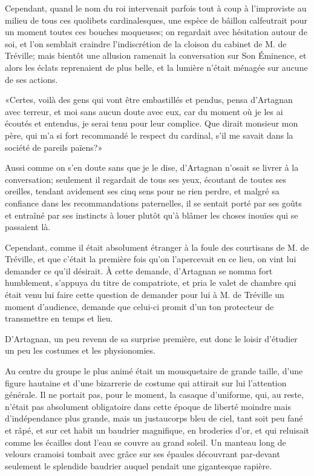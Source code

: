 Cependant, quand le nom du roi intervenait parfois tout à coup à l'improviste au milieu de tous ces quolibets cardinalesques, une espèce de bâillon calfeutrait pour un moment toutes ces bouches moqueuses; on regardait avec hésitation autour de soi, et l'on semblait craindre l'indiscrétion de la cloison du cabinet de M. de Tréville; mais bientôt une allusion ramenait la conversation sur Son Éminence, et alors les éclats reprenaient de plus belle, et la lumière n'était ménagée sur aucune de ses actions. 

«Certes, voilà des gens qui vont être embastillés et pendus, pensa d'Artagnan avec terreur, et moi sans aucun doute avec eux, car du moment où je les ai écoutés et entendus, je serai tenu pour leur complice. Que dirait monsieur mon père, qui m'a si fort recommandé le respect du cardinal, s'il me savait dans la société de pareils païens?» 

Aussi comme on s'en doute sans que je le dise, d'Artagnan n'osait se livrer à la conversation; seulement il regardait de tous ses yeux, écoutant de toutes ses oreilles, tendant avidement ses cinq sens pour ne rien perdre, et malgré sa confiance dans les recommandations paternelles, il se sentait porté par ses goûts et entraîné par ses instincts à louer plutôt qu'à blâmer les choses inouïes qui se passaient là. 

Cependant, comme il était absolument étranger à la foule des courtisans de M. de Tréville, et que c'était la première fois qu'on l'apercevait en ce lieu, on vint lui demander ce qu'il désirait. À cette demande, d'Artagnan se nomma fort humblement, s'appuya du titre de compatriote, et pria le valet de chambre qui était venu lui faire cette question de demander pour lui à M. de Tréville un moment d'audience, demande que celui-ci promit d'un ton protecteur de transmettre en temps et lieu. 

D'Artagnan, un peu revenu de sa surprise première, eut donc le loisir d'étudier un peu les costumes et les physionomies. 

Au centre du groupe le plus animé était un mousquetaire de grande taille, d'une figure hautaine et d'une bizarrerie de costume qui attirait sur lui l'attention générale. Il ne portait pas, pour le moment, la casaque d'uniforme, qui, au reste, n'était pas absolument obligatoire dans cette époque de liberté moindre mais d'indépendance plus grande, mais un justaucorps bleu de ciel, tant soit peu fané et râpé, et sur cet habit un baudrier magnifique, en broderies d'or, et qui reluisait comme les écailles dont l'eau se couvre au grand soleil. Un manteau long de velours cramoisi tombait avec grâce sur ses épaules découvrant par-devant seulement le splendide baudrier auquel pendait une gigantesque rapière. 

